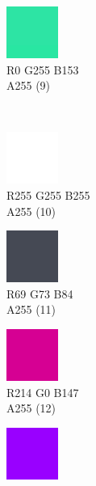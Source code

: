 \begin{figure}[!h]
\begin{subfigure}{0.105\textwidth}
		\includegraphics[frame]{gui-imgs/R0G255B153A255}
		\vspace*{-20px} \caption*{\hspace*{-0.25px}\tiny R0 G255 B153 \\ \tiny A255 (9)}
	\end{subfigure}\\
	\begin{subfigure}{0.105\textwidth}\centering
		\includegraphics[frame]{gui-imgs/R255G255B255A255}
		\vspace*{-20px}\caption*{\hspace*{-0.25px}\tiny R255 G255 B255 \\ \tiny A255 (10)}
	\end{subfigure}
	\begin{subfigure}{0.105\textwidth}\centering
		\includegraphics[frame]{gui-imgs/R69G73B84A255}
		\vspace*{-20px}\caption*{\hspace*{-0.25px}\tiny R69 G73 B84 \\ \tiny A255 (11)}
	\end{subfigure}
	\begin{subfigure}{0.105\textwidth}\centering
		\includegraphics[frame]{gui-imgs/R214G0B147A255}
		\vspace*{-20px} \caption*{\hspace*{-0.25px}\tiny R214 G0 B147 \\ \tiny A255 (12)}
	\end{subfigure}
	\begin{subfigure}{0.105\textwidth}\centering
		\includegraphics[frame]{gui-imgs/R153G0B255A255}

\end{subfigure}
\end{figure}
